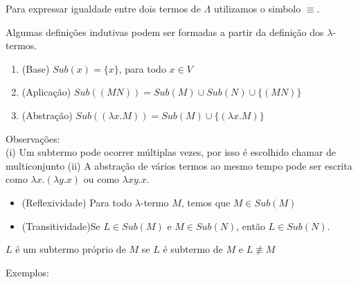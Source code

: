 \documentclass[../main.tex]{subfiles}
\begin{document}
Para expressar igualdade entre dois termos de $\Lambda$ utilizamos o simbolo $\equiv$.

Algumas definições indutivas podem ser formadas a partir da definição dos $\lambda$-termos.

\begin{definition}
    \hfill
    \begin{enumerate}
        \item (Base) $Sub(x) = \{x\}$, para todo $x \in V$
        \item (Aplicação) $Sub((M N)) = Sub(M) \cup Sub(N) \cup \{ (M N) \}$
        \item (Abstração) $Sub((\lambda x . M)) = Sub(M) \cup \{ (\lambda x . M) \}$
    \end{enumerate}

\end{definition}

Observações:\\
(i) Um subtermo pode ocorrer múltiplas vezes, por isso é escolhido chamar de multiconjunto
(ii) A abstração de vários termos ao mesmo tempo pode ser escrita como $\lambda x . (\lambda y . x)$ ou como $\lambda x y . x$.

\begin{lemma}
    \hfill
    \begin{itemize}
        \item (Reflexividade) Para todo $\lambda$-termo $M$, temos que $M \in Sub(M)$
        \item (Transitividade)Se $L \in Sub(M)$ e $M \in Sub(N)$, então $L \in Sub(N)$.
    \end{itemize}
\end{lemma}

\begin{definition}
    $L$ é um subtermo próprio de $M$ se $L$ é subtermo de $M$ e $L \not\equiv M$
\end{definition}

Exemplos: 
\end{document}
